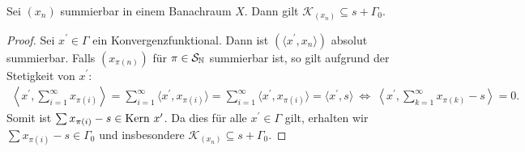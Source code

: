 \begin{sz}\label{th:subset_conv_area}
	Sei $ (x_n) $ summierbar in einem Banachraum $ X $.
	Dann gilt $ \mathcal{K}_{(x_n)} \subseteq s + \Gamma_0 $.
\end{sz}
\begin{proof}
	Sei $  x^\prime  \in \Gamma $ ein Konvergenzfunktional.
	Dann ist $ (\langle x^\prime,  x_n\rangle) $ absolut summierbar.
	Falls $  (x_{\pi(n)}) $ für $ \pi \in \mathcal{S}_{\mathbb{N}} $ summierbar ist, so gilt aufgrund der Stetigkeit von $ x^\prime $:
	\begin{align*}
		\left\langle x^\prime, \sum \limits_{i = 1}^\infty x_{\pi(i)}\right\rangle
		= \sum \limits_{i = 1}^\infty 	\langle  x^\prime, x_{\pi(i)} \rangle
		=
		\sum \limits_{i = 1}^\infty \langle  x^\prime, x_{\pi(i)} \rangle
		=
		\langle  x^\prime, s \rangle
		\ \Leftrightarrow \
		\left\langle x^\prime,
		\sum \limits_{k = 1}^\infty x_{\pi(k)}
		- s
		\right\rangle =0.
	\end{align*}
	Somit ist $ \sum x_{\pi(i)} -s  \in \mathrm{Kern} \ x^\prime $.
	Da dies für alle $ x^\prime \in \Gamma $ gilt, erhalten wir $ \sum x_{\pi(i)} -s \in \Gamma_0 $ und insbesondere $ \mathcal{K}_{(x_n)} \subseteq s + \Gamma_0 $.
\end{proof}






 